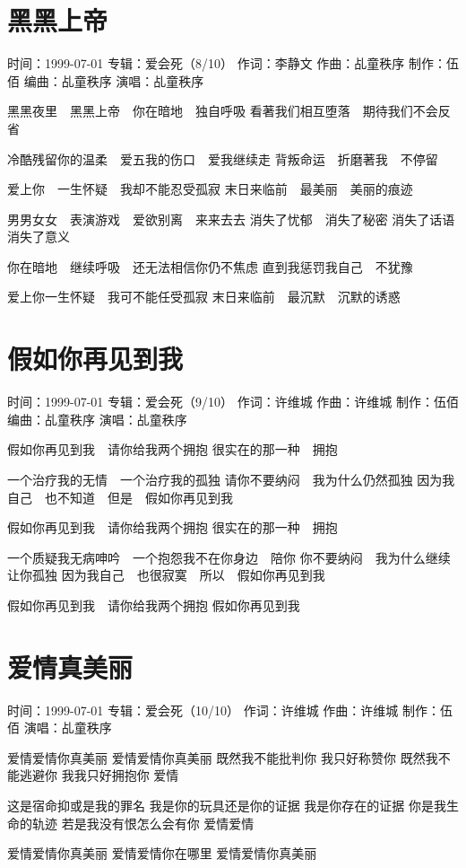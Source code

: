 \documentclass[UTF8,a4paper,oneside,twocolumn,12pt]{ctexbook}
\newcommand{\infopair}[2]{\textbullet #1：#2}
\newcommand{\zc}[1][伍佰]{\infopair{作词}{#1}}
\newcommand{\zq}[1][伍佰]{\infopair{作曲}{#1}}
\newcommand{\bq}[1][伍佰]{\infopair{编曲}{#1}}
\newcommand{\zj}[1]{\infopair{专辑}{#1}}
\newcommand{\zz}[1]{\infopair{制作}{#1}}
\newcommand{\sj}[1]{\infopair{时间}{#1}}
\newenvironment{info}{\begin{flushleft}\kaishu
	}
	{\end{flushleft}\normalsize\yahei\par}
\newenvironment{lyric}{
	}
{}
\begin{document}
\section{黑黑上帝}
\begin{info}
	\sj{1999-07-01}
	\zj{爱会死（8/10）}
	\zc[李静文]
	\zq[乩童秩序]
	\zz{伍佰}
	\bq[乩童秩序]
	\infopair{演唱}{乩童秩序}
\end{info}
\begin{lyric}
	黑黑夜里　黑黑上帝　你在暗地　独自呼吸
	看著我们相互堕落　期待我们不会反省

	冷酷残留你的温柔　爱五我的伤口　爱我继续走
	背叛命运　折磨著我　不停留

	爱上你　一生怀疑　我却不能忍受孤寂
	末日来临前　最美丽　美丽的痕迹

	男男女女　表演游戏　爱欲别离　来来去去
	消失了忧郁　消失了秘密
	消失了话语　消失了意义

	你在暗地　继续呼吸　还无法相信你仍不焦虑
	直到我惩罚我自己　不犹豫

	爱上你一生怀疑　我可不能任受孤寂
	末日来临前　最沉默　沉默的诱惑
\end{lyric}

\section{假如你再见到我}
\begin{info}
	\sj{1999-07-01}
	\zj{爱会死（9/10）}
	\zc[许维城]
	\zq[许维城]
	\zz{伍佰}
	\bq[乩童秩序]
	\infopair{演唱}{乩童秩序}
\end{info}
\begin{lyric}
	假如你再见到我　请你给我两个拥抱
	很实在的那一种　拥抱

	一个治疗我的无情　一个治疗我的孤独
	请你不要纳闷　我为什么仍然孤独
	因为我自己　也不知道　但是　假如你再见到我

	假如你再见到我　请你给我两个拥抱
	很实在的那一种　拥抱

	一个质疑我无病呻吟　一个抱怨我不在你身边　陪你
	你不要纳闷　我为什么继续让你孤独
	因为我自己　也很寂寞　所以　假如你再见到我

	假如你再见到我　请你给我两个拥抱
	假如你再见到我
\end{lyric}

\section{爱情真美丽}
\begin{info}
	\sj{1999-07-01}
	\zj{爱会死（10/10）}
	\zc[许维城]
	\zq[许维城]
	\zz{伍佰}
	\infopair{演唱}{乩童秩序}
\end{info}
\begin{lyric}
	爱情爱情你真美丽
	爱情爱情你真美丽
	既然我不能批判你
	我只好称赞你
	既然我不能逃避你
	我我只好拥抱你
	爱情

	这是宿命抑或是我的罪名
	我是你的玩具还是你的证据
	我是你存在的证据
	你是我生命的轨迹
	若是我没有恨怎么会有你
	爱情爱情

	爱情爱情你真美丽
	爱情爱情你在哪里
	爱情爱情你真美丽
\end{lyric}
\end{document}
